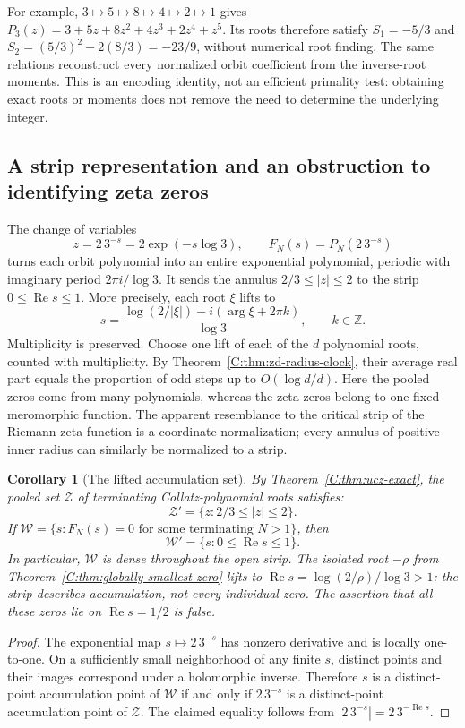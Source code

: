 \documentclass[11pt,a4paper]{article}
\newtheorem{corollary}[theorem]{Corollary}
\theoremstyle{definition}
\theoremstyle{remark}
\numberwithin{equation}{section}
\begin{document}
For example, $3\mapsto5\mapsto8\mapsto4\mapsto2\mapsto1$ gives
$P_3(z)=3+5z+8z^2+4z^3+2z^4+z^5$. Its roots therefore satisfy
$S_1=-5/3$ and $S_2=(5/3)^2-2(8/3)=-23/9$, without numerical root finding.
The same relations reconstruct every normalized orbit coefficient from the
inverse-root moments. This is an encoding identity, not an efficient
primality test: obtaining exact roots or moments does not remove the need to
determine the underlying integer.

\subsection{A strip representation and an obstruction to identifying zeta zeros}
\label{C:subsec:zr-strip}

The change of variables
\[
 z=2\,3^{-s}=2\exp(-s\log3),\qquad F_N(s)=P_N(2\,3^{-s})
\]
turns each orbit polynomial into an entire exponential polynomial, periodic
with imaginary period $2\pi i/\log3$. It sends the annulus
$2/3\leq|z|\leq2$ to the strip $0\leq\operatorname{Re}s\leq1$.
More precisely, each root $\xi$ lifts to
\begin{equation}\label{C:eq:zr-lift}
 s=\frac{\log(2/|\xi|)-i(\arg\xi+2\pi k)}{\log3},
 \qquad k\in\mathbb Z.
\end{equation}
Multiplicity is preserved. Choose one lift of each of the $d$ polynomial roots, counted with multiplicity. By Theorem~\ref{C:thm:zd-radius-clock}, their average real part equals the proportion of odd steps up to $O(\log d/d)$. Here the pooled zeros come from many polynomials, whereas the zeta zeros belong to one fixed meromorphic function. The apparent resemblance to the critical strip
of the Riemann zeta function is a coordinate normalization; every annulus
of positive inner radius can similarly be normalized to a strip.

\begin{corollary}[The lifted accumulation set]
\label{C:cor:zr-strip-accumulation}
By Theorem~\ref{C:thm:ucz-exact}, the pooled set $\mathcal Z$ of terminating
Collatz-polynomial roots satisfies:
\[
 \mathcal Z'=\{z:2/3\leq|z|\leq2\}.
\]
If $\mathcal W=\{s:F_N(s)=0\text{ for some terminating }N>1\}$, then
\[
 \mathcal W'=\{s:0\leq\operatorname{Re}s\leq1\}.
\]
In particular, $\mathcal W$ is dense throughout the open strip. The isolated root $-\rho$ from Theorem~\ref{C:thm:globally-smallest-zero} lifts to $\operatorname{Re}s=\log(2/\rho)/\log3>1$: the strip describes accumulation, not every individual zero. The assertion that all these zeros lie on $\operatorname{Re}s=1/2$ is false.
\end{corollary}
\begin{proof}
The exponential map $s\mapsto2\,3^{-s}$ has nonzero derivative and is locally
one-to-one. On a sufficiently small neighborhood of any finite $s$, distinct
points and their images correspond under a holomorphic inverse. Therefore
$s$ is a distinct-point accumulation point of $\mathcal W$ if and only if
$2\,3^{-s}$ is a distinct-point accumulation point of $\mathcal Z$.
The claimed equality follows from
$|2\,3^{-s}|=2\,3^{-\operatorname{Re}s}$.
\end{proof}
\end{document}
